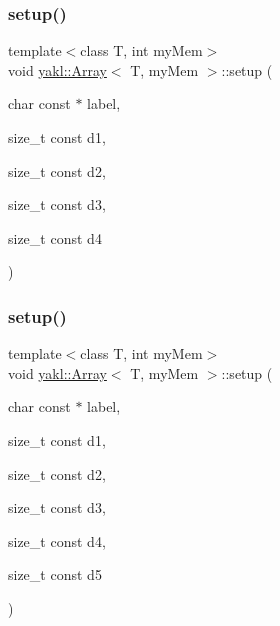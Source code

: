 \subsubsection{\texorpdfstring{setup()}{setup()}\hspace{0.1cm}{\footnotesize\ttfamily [4/8]}}
{\footnotesize\ttfamily template$<$class T, int my\+Mem$>$ \\
void \hyperlink{classyakl_1_1Array}{yakl\+::\+Array}$<$ T, my\+Mem $>$\+::setup (\begin{DoxyParamCaption}\item[{char const $\ast$}]{label,  }\item[{size\+\_\+t const}]{d1,  }\item[{size\+\_\+t const}]{d2,  }\item[{size\+\_\+t const}]{d3,  }\item[{size\+\_\+t const}]{d4 }\end{DoxyParamCaption})\hspace{0.3cm}{\ttfamily [inline]}}

\mbox{\label{classyakl_1_1Array_a5767b7a3c6403b9fe168065a51464b18}} 
\subsubsection{\texorpdfstring{setup()}{setup()}\hspace{0.1cm}{\footnotesize\ttfamily [5/8]}}
{\footnotesize\ttfamily template$<$class T, int my\+Mem$>$ \\
void \hyperlink{classyakl_1_1Array}{yakl\+::\+Array}$<$ T, my\+Mem $>$\+::setup (\begin{DoxyParamCaption}\item[{char const $\ast$}]{label,  }\item[{size\+\_\+t const}]{d1,  }\item[{size\+\_\+t const}]{d2,  }\item[{size\+\_\+t const}]{d3,  }\item[{size\+\_\+t const}]{d4,  }\item[{size\+\_\+t const}]{d5 }\end{DoxyParamCaption})\hspace{0.3cm}{\ttfamily [inline]}}

\mbox{\label{classyakl_1_1Array_a826e9f4fdeada27345cd8a4a0d009a2e}} 
